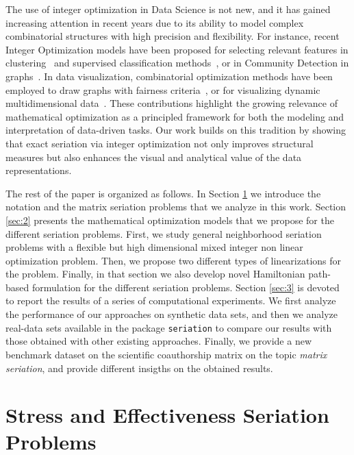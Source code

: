 \documentclass[a4paper,11pt, reqno]{amsart}
\begin{document}
The use of integer optimization in Data Science is not new, and it has gained increasing attention in recent years due to its ability to model complex combinatorial structures with high precision and flexibility. For instance, recent Integer Optimization models have been proposed for selecting relevant features in clustering~\cite{benati2018mixed} and supervised classification methods~\cite{maldonado2011simultaneous,maldonado2014feature}, or in Community Detection in graphs~\cite{li2016quantitative,ponce2024mixed}. In data visualization, combinatorial optimization methods have been employed to draw graphs with fairness criteria~\cite{eades2025introducing}, or for visualizing dynamic multidimensional data~\cite{carrizosa2019visualization}. These contributions highlight the growing relevance of mathematical optimization as a principled framework for both the modeling and interpretation of data-driven tasks. Our work builds on this tradition by showing that exact seriation via integer optimization not only improves structural measures but also enhances the visual and analytical value of the data representations.

The rest of the paper is organized as follows. In Section \ref{sec:1} we introduce the notation and the matrix seriation problems that we analyze in this work. Section \ref{sec:2} presents the mathematical optimization models that we propose for the different seriation problems. First, we study general neighborhood seriation problems with a flexible but high dimensional mixed integer non linear optimization problem. Then, we propose two different types of linearizations for the problem. Finally, in that section we also develop novel Hamiltonian path-based formulation for the different seriation problems. Section \ref{sec:3} is devoted to report the results of a series of computational experiments. We first analyze the performance of our approaches on synthetic data sets, and then we analyze real-data sets available in the package \texttt{seriation} to compare our results with those obtained with other existing approaches. Finally, we provide a new benchmark dataset on the scientific coauthorship matrix on the topic \textit{matrix seriation}, and provide different insigths on the obtained results.






\section{Stress and Effectiveness Seriation Problems} \label{sec:1}
\end{document}
